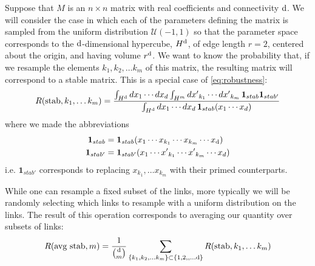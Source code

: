 Suppose that $M$ is an $n \times n$ matrix with real coefficients and connectivity $\mathrm{d}$. We will consider the case in which each of the parameters defining the matrix is sampled from the uniform distribution $\mathcal{U}(-1,1)$ so that the parameter space corresponds to the $\mathrm{d}$-dimensional hypercube, $H^{\mathrm{d}}$, of edge length $r=2$, centered about the origin, and having volume $r^{\mathrm{d}}$.  We want to know the probability that, if we resample the elements $k_1, k_2, \ldots k_m$ of this matrix, the resulting matrix will correspond to a stable matrix.  This is a special case of \ref{eq:robustness}:
\begin{equation}\label{eq:condprobgen}
 R (\mathrm{stab}, k_1, \ldots k_m) =
  \frac{\int_{H^{\mathrm{d}}} dx_1 \cdots dx_d \int_{H^m} {dx'}_{k_1} \cdots {dx'}_{k_m}\,
    \mathbf{1}_{stab} \mathbf{1}_{stab'}}
  {\int_{H^{\mathrm{d}}} dx_1 \cdots dx_d  \, \mathbf{1}_{stab}(x_1 \cdots x_d)}
\end{equation}
where we made the abbreviations
\begin{align*}
\mathbf{1}_{stab} &= \mathbf{1}_{stab}(x_1 \cdots x_{k_1} \cdots x_{k_m} \cdots x_{\mathrm{d}}) \\
\mathbf{1}_{stab'} &= \mathbf{1}_{stab'}(x_1 \cdots {x'}_{k_1} \cdots {x'}_{k_m}  \cdots x_d)
\end{align*}
i.e. $\mathbf{1}_{stab'}$ corresponds to replacing $x_{k_1}, \ldots x_{k_m}$ with their primed counterparts.

While one can resample a fixed subset of the links, more typically we will be randomly selecting which links to resample with a uniform distribution on the links.  The result of this operation corresponds to averaging our quantity over subsets of links:
\begin{equation}
R (\hbox{avg stab}, m) =
\frac{1}{\binom{\mathrm{d}}{m}}
\sum_{\{k_1, k_2, \ldots k_m\} \subset \{1, 2,, \ldots \mathrm{d}\}}
R (\mathrm{stab}, k_1, \ldots k_m)
\end{equation}

